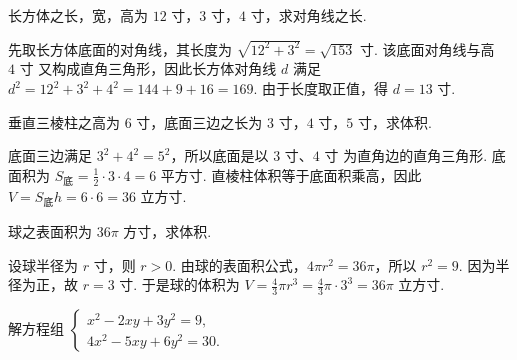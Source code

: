 \begin{problem}
长方体之长，宽，高为 \(12\text{ 寸}\)，\(3\text{ 寸}\)，\(4\text{ 寸}\)，求对角线之长.
\end{problem}

\begin{solution}
先取长方体底面的对角线，其长度为 \(\sqrt{12^2+3^2}=\sqrt{153}\text{ 寸}\). 该底面对角线与高 \(4\text{ 寸}\) 又构成直角三角形，因此长方体对角线 \(d\) 满足 \(d^2=12^2+3^2+4^2=144+9+16=169\). 由于长度取正值，得 \(d=13\text{ 寸}\).
\end{solution}

\begin{problem}
垂直三棱柱之高为 \(6\text{ 寸}\)，底面三边之长为 \(3\text{ 寸}\)，\(4\text{ 寸}\)，\(5\text{ 寸}\)，求体积.
\end{problem}

\begin{solution}
底面三边满足 \(3^2+4^2=5^2\)，所以底面是以 \(3\text{ 寸}\)、\(4\text{ 寸}\) 为直角边的直角三角形. 底面积为 \(S_{\text{底}}=\frac12\cdot3\cdot4=6\text{ 平方寸}\). 直棱柱体积等于底面积乘高，因此 \(V=S_{\text{底}}h=6\cdot6=36\text{ 立方寸}\).
\end{solution}

\begin{problem}
球之表面积为 \(36\pi\text{ 方寸}\)，求体积.
\end{problem}

\begin{solution}
设球半径为 \(r\text{ 寸}\)，则 \(r>0\). 由球的表面积公式，\(4\pi r^2=36\pi\)，所以 \(r^2=9\). 因为半径为正，故 \(r=3\text{ 寸}\). 于是球的体积为 \(V=\frac43\pi r^3=\frac43\pi\cdot3^3=36\pi\text{ 立方寸}\).
\end{solution}

\begin{problem}
解方程组 \(\begin{cases}
x^{2} - 2xy + 3y^{2} = 9,\\
4x^{2} - 5xy + 6y^{2} = 30.
\end{cases}\)
\end{problem}

